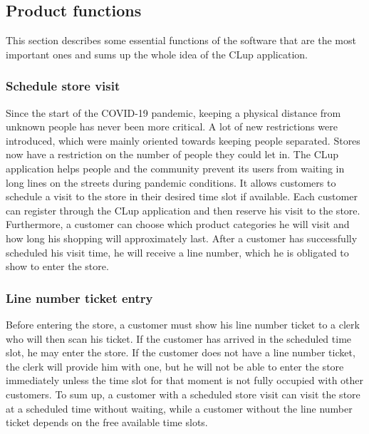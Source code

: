 \subsection{Product functions}



This section describes some essential functions of the software that are the most important ones and sums up the whole idea of the CLup application.

\subsubsection {Schedule store visit}
Since the start of the COVID-19 pandemic, keeping a physical distance from unknown people has never been more critical.
A lot of new restrictions were introduced, which were mainly oriented towards keeping people separated.
Stores now have a restriction on the number of people they could let in.
The CLup application helps people and the community prevent its users from waiting in long lines on the streets during pandemic conditions.
It allows customers to schedule a visit to the store in their desired time slot if available.
Each customer can register through the CLup application and then reserve his visit to the store.
Furthermore, a customer can choose which product categories he will visit and how long his shopping will approximately last.
After a customer has successfully scheduled his visit time, he will receive a line number, which he is obligated to show to enter the store.

\subsubsection {Line number ticket entry}
Before entering the store, a customer must show his line number ticket to a clerk who will then scan his ticket.
If the customer has arrived in the scheduled time slot, he may enter the store.
If the customer does not have a line number ticket, the clerk will provide him with one, but he will not be able to enter the store immediately unless the time slot for that moment is not fully occupied with other customers.
To sum up, a customer with a scheduled store visit can visit the store at a scheduled time without waiting, while a customer without the line number ticket depends on the free available time slots.

